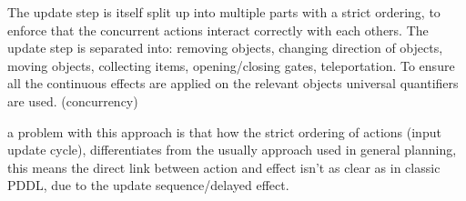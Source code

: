 		The update step is itself split up into multiple parts with a strict ordering, to enforce that the concurrent actions interact correctly with each others. The update step is separated into: removing objects, changing direction of objects, moving objects, collecting items, opening/closing gates, teleportation. To ensure all the continuous effects are applied on the relevant objects universal quantifiers are used. (concurrency)
		
		a problem with this approach is that how the strict ordering of actions (input update cycle), differentiates from the usually approach used in general planning, this means the direct link between action and effect isn't as clear as in classic PDDL, due to the update sequence/delayed effect. 
		
	

	
	
	

	
	
	
	
	
